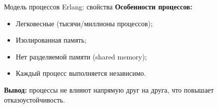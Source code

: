 \begin{frame}{Модель процессов Erlang: свойства}
	\textbf{Особенности процессов:}
	\vspace{0.5em}
	\begin{itemize}
		\item Легковесные (тысячи/миллионы процессов);
		\item Изолированная память;
		\item Нет разделяемой памяти (shared memory);
		\item Каждый процесс выполняется независимо.
	\end{itemize}
	\vspace{0.8em}
	\textbf{Вывод:} процессы не влияют напрямую друг на друга, что повышает отказоустойчивость.
\end{frame}